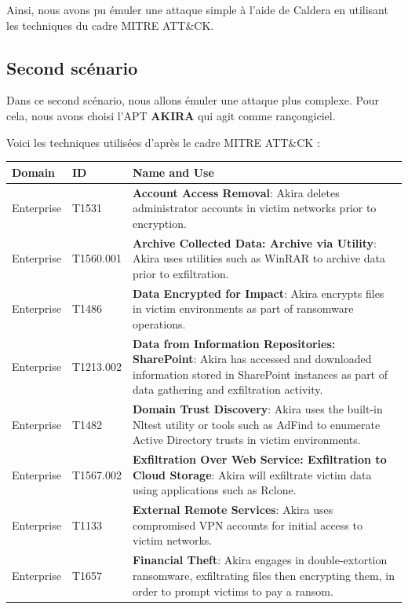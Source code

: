 \documentclass[12pt,letterpaper]{article}
\begin{document}
Ainsi, nous avons pu émuler une attaque simple à l'aide de Caldera en utilisant les techniques du cadre MITRE ATT\&CK.

\newpage
\subsection{Second scénario}

Dans ce second scénario, nous allons émuler une attaque plus complexe.
Pour cela, nous avons choisi l'APT \textbf{AKIRA} qui agit comme rançongiciel.

Voici les techniques utilisées d'après le cadre MITRE ATT\&CK \cite{AkiraGOLDSAHARA} :
\begin{table}[h!]
    \centering
    \begin{tabular}{|l|l|p{10cm}|}
        \hline
        \textbf{Domain} & \textbf{ID} & \textbf{Name and Use} \\ \hline
        Enterprise & T1531 & \textbf{Account Access Removal}: Akira deletes administrator accounts in victim networks prior to encryption. \\ \hline
        Enterprise & T1560.001 & \textbf{Archive Collected Data: Archive via Utility}: Akira uses utilities such as WinRAR to archive data prior to exfiltration. \\ \hline
        Enterprise & T1486 & \textbf{Data Encrypted for Impact}: Akira encrypts files in victim environments as part of ransomware operations. \\ \hline
        Enterprise & T1213.002 & \textbf{Data from Information Repositories: SharePoint}: Akira has accessed and downloaded information stored in SharePoint instances as part of data gathering and exfiltration activity. \\ \hline
        Enterprise & T1482 & \textbf{Domain Trust Discovery}: Akira uses the built-in Nltest utility or tools such as AdFind to enumerate Active Directory trusts in victim environments. \\ \hline
        Enterprise & T1567.002 & \textbf{Exfiltration Over Web Service: Exfiltration to Cloud Storage}: Akira will exfiltrate victim data using applications such as Rclone. \\ \hline
        Enterprise & T1133 & \textbf{External Remote Services}: Akira uses compromised VPN accounts for initial access to victim networks. \\ \hline
        Enterprise & T1657 & \textbf{Financial Theft}: Akira engages in double-extortion ransomware, exfiltrating files then encrypting them, in order to prompt victims to pay a ransom. \\ \hline

\end{tabular}
\end{table}
\end{document}
